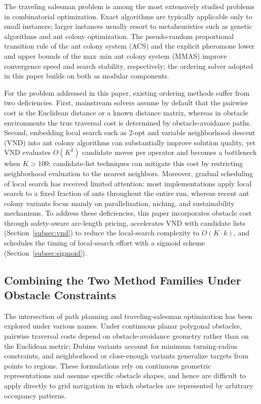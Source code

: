 The traveling salesman problem is among the most extensively studied problems in combinatorial optimization\textcolor{blue}{\cite{ref4,ref36}}. Exact algorithms are typically applicable only to small instances; larger instances usually resort to metaheuristics such as genetic algorithms\textcolor{blue}{\cite{ref19}} and ant colony optimization\textcolor{blue}{\cite{ref21,ref42}}. The pseudo-random proportional transition rule of the ant colony system (ACS)\textcolor{blue}{\cite{ref22}} and the explicit pheromone lower and upper bounds of the max--min ant colony system (MMAS)\textcolor{blue}{\cite{ref23}} improve convergence speed and search stability, respectively; the ordering solver adopted in this paper builds on both as modular components.

For the problem addressed in this paper, existing ordering methods suffer from two deficiencies. First, mainstream solvers assume by default that the pairwise cost is the Euclidean distance or a known distance matrix, whereas in obstacle environments the true traversal cost is determined by obstacle-avoidance paths. Second, embedding local search such as 2-opt and variable neighborhood descent (VND) into ant colony algorithms can substantially improve solution quality\textcolor{blue}{\cite{ref24,ref25,ref43}}, yet VND evaluates $O(K^2)$ candidate moves per operator and becomes a bottleneck when $K > 100$; candidate-list techniques can mitigate this cost by restricting neighborhood evaluation to the nearest neighbors\textcolor{blue}{\cite{ref26}}. Moreover, gradual scheduling of local search has received limited attention: most implementations apply local search to a fixed fraction of ants throughout the entire run, whereas recent ant colony variants focus mainly on parallelization, niching, and sustainability mechanisms\textcolor{blue}{\cite{ref27,ref28,ref29,ref30}}. To address these deficiencies, this paper incorporates obstacle cost through safety-aware arc-length pricing, accelerates VND with candidate lists (Section~\textcolor{blue}{\ref{subsec:vnd}}) to reduce the local-search complexity to $O(K \cdot k)$, and schedules the timing of local-search effort with a sigmoid scheme (Section~\textcolor{blue}{\ref{subsec:sigmoid}}).

\subsection{Combining the Two Method Families Under Obstacle Constraints}

The intersection of path planning and traveling-salesman optimization has been explored under various names\textcolor{blue}{\cite{ref4,ref36}}. Under continuous planar polygonal obstacles, pairwise traversal costs depend on obstacle-avoidance geometry rather than on the Euclidean metric\textcolor{blue}{\cite{ref39}}; Dubins variants account for minimum turning-radius constraints, and neighborhood or close-enough variants generalize targets from points to regions\textcolor{blue}{\cite{ref40}}. These formulations rely on continuous geometric representations and assume specific obstacle shapes, and hence are difficult to apply directly to grid navigation in which obstacles are represented by arbitrary occupancy patterns.

